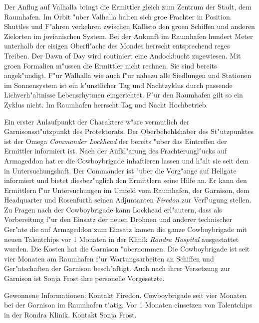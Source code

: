 Der Anflug auf Valhalla bringt die Ermittler gleich zum Zentrum der Stadt, dem Raumhafen. Im Orbit "uber Valhalla halten sich gro\3e Frachter in Position. Shuttles und F"ahren verkehren zwischen Kallisto den gro\3en Schiffen und anderen Zielorten im jovianischen System. Bei der Ankunft im Raumhafen hundert Meter unterhalb der eisigen Oberfl"ache des Mondes herrscht entsprechend reges Treiben. Der Dawn of Day wird routiniert eine Andockbucht zugewiesen. Mit gro\3en Formalien m"ussen die Ermittler nicht rechnen. Sie sind bereits angek"undigt. F"ur Walhalla wie auch f"ur nahezu alle Siedlungen und Stationen im Sonnensystem ist ein k"unstlicher Tag und Nachtzyklus durch passende Lichverh"altnisse Lebensrhytmen eingerichtet. F"ur den Raumhafen gilt so ein Zyklus nicht. Im Raumhafen herrscht Tag und Nacht Hochbetrieb. 



Ein erster Anlaufpunkt der Charaktere w"are vermutlich der Garnisonsst"utzpunkt des Protektorats. Der Oberbehehlshaber des St"utzpunktes ist der Omega \emph{Commander Lockhead} der bereits "uber das Eintreffen der Ermittler informiert ist. Nach der Aufkl"arung des Frachterungl"ucks auf Armageddon hat er die Cowboybrigade inhaftieren lassen und h"alt sie seit dem in Untersuchungshaft. Der Commander ist "uber die Vorg"ange auf Hellgate informiert und bietet diesbez"uglich den Ermittlern seine Hilfe an. Er kann den Ermittlern f"ur Untersuchungen im Umfeld vom Raumhafen, der Garnison, dem Headquarter und Rosenfurth seinen Adjuntanten \emph{Firedon} zur Verf"ugung stellen. Zu Fragen nach der Cowboybrigade kann Lockhead erl"autern, dass als Vorbereitung f"ur den Einsatz der neuen Drohnen und anderer technischer Ger"ate die auf Armageddon zum Einsatz kamen die ganze Cowboybrigade mit neuen Talentchips vor 1 Monaten in der Klinik \emph{Rondra Hospital} ausgestattet wurden. Die Kosten hat die Garnison "ubernommen. Die Cowboybrigade ist seit vier Monaten am Raumhafen f"ur Wartungsarbeiten an Schiffen und Ger"atschaften der Garnison besch"aftigt. Auch nach ihrer Versetzung zur Garnison ist Sonja Frost ihre personelle Vorgesetzte.

\begin{remarks}
	Gewonnene Informationen: Kontakt Firedon. Cowboybrigade seit vier Monaten bei der Garnison im Raumhafen t"atig. Vor 1 Monaten einsetzen von Talentchips in der Rondra Klinik. Kontakt Sonja Frost.
\end{remarks}



